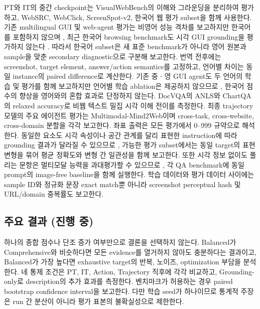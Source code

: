 PT와 IT의 중간 checkpoint는 VisualWebBench의 이해와 그라운딩을
분리하여 평가하고, WebSRC, WebClick, ScreenSpot-v2, 한국어 웹
평가 subset을 함께 사용한다. 기존 multilingual GUI 및 web-agent
평가는 비영어 성능 격차를 보고하지만 한국어를 포함하지 않으며
\citep{chen2025mprgui,wang2025xwebagent}, 최근 한국어 browsing
benchmark도 시각 GUI grounding을 평가하지 않는다
\citep{lee2026kbrowsecomp}. 따라서 한국어 subset은 새 표준
benchmark가 아니라 영어 원본과 sample을 맞춘 secondary diagnostic으로
구분해 보고한다. 번역 전후에는 screenshot, target element,
answer/action semantics를 고정하고, 언어별 차이는 동일 instance의
paired difference로 계산한다. 기존 중ㆍ영 GUI agent도 두 언어의 학습 및 평가를
함께 보고하지만 언어별 학습 ablation은 제공하지 않으므로
\citep{zhang2025agentcpm}, 한국어 점수의 향상을 영어와의 혼합
효과로 단정하지 않는다. DocVQA의 ANLS와 ChartQA의 relaxed
accuracy로 비웹 텍스트 밀집 시각 이해 전이를 측정한다. 최종
trajectory 모델의 주요 에이전트 평가는 Multimodal-Mind2Web이며
cross-task, cross-website, cross-domain 분할을 각각 보고한다.
좌표 출력은 모든 평가에서 0--999 규약으로 해석한다. 동일한 요소도
시각 속성이나 공간 관계를 달리 표현한 instruction에 따라 grounding
결과가 달라질 수 있으므로 \citep{jandial2026grounders}, 가능한
평가 subset에서는 동일 target의 표현 변형을 묶어 평균 정확도와
변형 간 일관성을 함께 보고한다.
또한 시각 정보 없이도 풀리는 문항은 멀티모달 능력을 과대평가할 수
있으므로 \citep{chen2024mmstar}, 각 QA benchmark에 동일 prompt의
image-free baseline을 함께 실행한다. 학습 데이터와 평가 데이터
사이에는 sample ID와 정규화 문장 exact match뿐 아니라 screenshot
perceptual hash 및 URL/domain 중복률도 보고한다.

\subsection{주요 결과 (진행 중)}




하나의 종합 점수나 단조 증가 여부만으로 결론을 선택하지 않는다.
Balanced가 Comprehensive와 비슷하다면 모든 evidence를 열거하지
않아도 충분하다는 결과이고, Balanced가 가장 높다면 exhaustive
target의 반복, 노이즈, optimization 부담을 분석한다. 네 통제
조건은 PT, IT, Action, Trajectory 직후에 각각 비교하고,
Grounding-only로 description의 추가 효과를 측정한다. 벤치마크가
허용하는 경우 paired bootstrap confidence interval을 보고한다.
다만 학습 seed가 하나이므로 통계적 주장은 run 간 분산이 아니라
평가 표본의 불확실성으로 제한한다.
